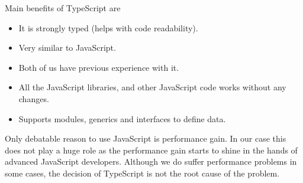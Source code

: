 Main benefits of TypeScript are
\begin{itemize}
    \item It is strongly typed (helps with code readability).
    \item Very similar to JavaScript.
    \item Both of us have previous experience with it.
    \item All the JavaScript libraries, and other JavaScript code works without any changes.
    \item Supports modules, generics and interfaces to define data.
\end{itemize}

Only debatable reason to use JavaScript is performance gain.
In our case this does not play a huge role as the performance gain starts to shine in the hands of advanced JavaScript developers.
Although we do suffer performance problems in some cases, the decision of TypeScript is not the root cause of the problem.



